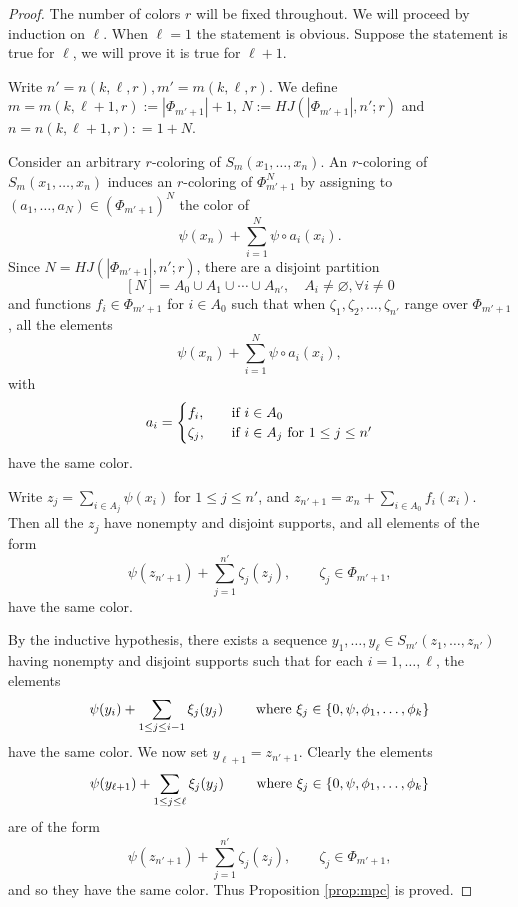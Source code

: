 \begin{proof}
The number of colors $r$ will be fixed throughout. We will proceed by induction on $\ell$. When $\ell=1$ the statement is obvious. Suppose the statement is true for $\ell$, we will prove it is true for $\ell+1$. 

Write $n' = n(k,\ell, r), m'=m(k,\ell, r)$. We define $m = m(k,\ell + 1, r):=|\Phi_{m'+1}| +1$, $N:=HJ( |\Phi_{m'+1}|, n';r)$ and $n = n(k, \ell+1,r): = 1 + N$.

Consider an arbitrary $r$-coloring of $S_{m}(x_1,\ldots, x_n)$. An $r$-coloring of $S_{m}(x_1,\ldots, x_n)$ induces an $r$-coloring of $\Phi_{m'+1}^{N}$ by assigning to 
$(a_1, \ldots, a_{N}) \in (\Phi_{m'+1})^{N}$ the color of 
\[
\psi (x_n) + \sum_{i=1}^{N} \psi \circ a_i (x_i).
\]
Since $N=HJ( |\Phi_{m'+1}|, n';r)$, there are a disjoint partition
\[
[N] = A_0 \cup A_1 \cup \cdots \cup A_{n'}, \quad A_i \neq \varnothing, \forall i \neq 0
\]
and functions $f_i \in \Phi_{m' + 1}$ for $i \in A_0$ such that when $\zeta_1, \zeta_2, \ldots, \zeta_{n'}$ range over $\Phi_{m'+1}$, all the elements 
\[
\psi(x_n) + \sum_{i=1}^{N} \psi \circ a_i (x_i),
\] 
with
\begin{equation*}
a_i = 
\begin{cases}
f_i, \quad &\textup{if}\ i \in A_0 \\
\zeta_j, \quad &\textup{if}\ i \in A_j \text{ for } 1 \leq j \leq n'
\end{cases}
\end{equation*}
have the same color.

Write $z_j = \sum_{i \in A_j} \psi(x_i)$ for $1 \leq j \leq n'$, and $z_{n'+1} = x_{n} + \sum_{i \in A_0} f_i(x_i)$. Then all the $z_j$ have nonempty and disjoint supports, and all elements of the form
\[
\psi(z_{n'+1}) + \sum_{j=1}^{n'} \zeta_j (z_j), \qquad \zeta_j \in \Phi_{m'+1},
\]
have the same color.

By the inductive hypothesis, there exists a sequence $y_1, \ldots, y_\ell \in S_{m'} (z_1, \ldots, z_{n'})$ having nonempty and disjoint supports such that for each $i=1, \ldots, \ell$, the elements
\[
\psi(y_i) + \sum_{1 \leq j \leq i-1} \xi_j (y_j) \qquad \textup{ where } \xi_j \in \{ 0, \psi, \phi_1, \ldots, \phi_k \}
\]
have the same color. We now set $y_{\ell+1} = z_{n'+1}$. Clearly the elements 
\[
\psi(y_{\ell+1}) + \sum_{1 \leq j \leq \ell} \xi_j (y_j) \qquad \textup{ where } \xi_j \in \{ 0, \psi, \phi_1, \ldots, \phi_k \}
\]
are of the form
\[
\psi(z_{n'+1}) + \sum_{j=1}^{n'} \zeta_j (z_j), \qquad \zeta_j \in \Phi_{m'+1},
\]
and so they have the same color. Thus  Proposition \ref{prop:mpc} is proved.
\end{proof}

